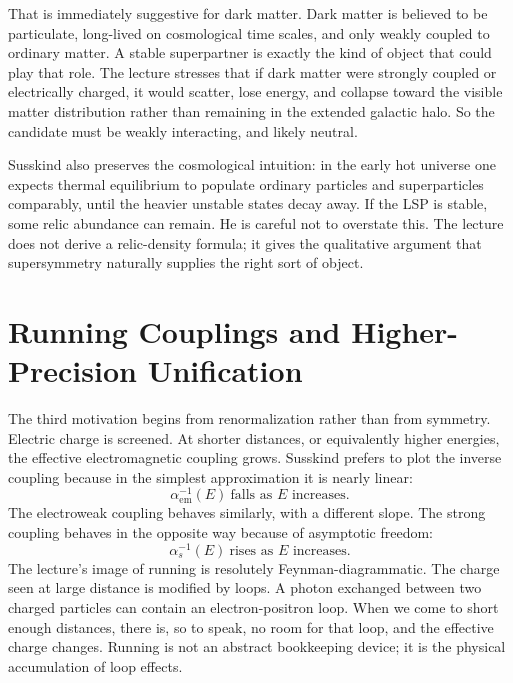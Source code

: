 That is immediately suggestive for dark matter. Dark matter is believed to be particulate, long-lived on cosmological time scales, and only weakly coupled to ordinary matter. A stable superpartner is exactly the kind of object that could play that role. The lecture stresses that if dark matter were strongly coupled or electrically charged, it would scatter, lose energy, and collapse toward the visible matter distribution rather than remaining in the extended galactic halo. So the candidate must be weakly interacting, and likely neutral.

Susskind also preserves the cosmological intuition: in the early hot universe one expects thermal equilibrium to populate ordinary particles and superparticles comparably, until the heavier unstable states decay away. If the LSP is stable, some relic abundance can remain. He is careful not to overstate this. The lecture does not derive a relic-density formula; it gives the qualitative argument that supersymmetry naturally supplies the right sort of object.

\section{Running Couplings and Higher-Precision Unification}

The third motivation begins from renormalization rather than from symmetry. Electric charge is screened. At shorter distances, or equivalently higher energies, the effective electromagnetic coupling grows. Susskind prefers to plot the inverse coupling because in the simplest approximation it is nearly linear:
\begin{equation}
\alpha_{\mathrm{em}}^{-1}(E) \ \text{falls as } E \text{ increases}.
\end{equation}
The electroweak coupling behaves similarly, with a different slope. The strong coupling behaves in the opposite way because of asymptotic freedom:
\begin{equation}
\alpha_s^{-1}(E) \ \text{rises as } E \text{ increases}.
\end{equation}
The lecture's image of running is resolutely Feynman-diagrammatic. The charge seen at large distance is modified by loops. A photon exchanged between two charged particles can contain an electron-positron loop. When we come to short enough distances, there is, so to speak, no room for that loop, and the effective charge changes. Running is not an abstract bookkeeping device; it is the physical accumulation of loop effects.


